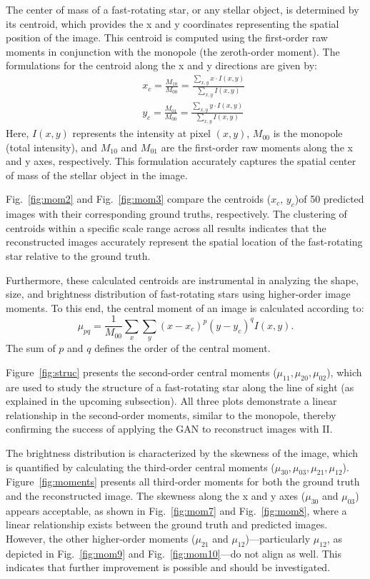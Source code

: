 The center of mass of a fast-rotating star, or any stellar object, is determined by its centroid, which provides the x and y coordinates representing the spatial position of the image. This centroid is computed using the first-order raw moments in conjunction with the monopole (the zeroth-order moment). The formulations for the centroid along the x and y directions are given by:
\begin{eqnarray}
&&x_c = \frac{M_{10}}{M_{00}} = \frac{\sum_{x,y} x \cdot I(x,y)}{\sum_{x,y} I(x,y)} \nonumber \\
&&y_c = \frac{M_{01}}{M_{00}} = \frac{\sum_{x,y} y \cdot I(x,y)}{\sum_{x,y} I(x,y)}
\end{eqnarray}
Here, \(I(x,y)\) represents the intensity at pixel \((x,y)\), \(M_{00}\) is the monopole (total intensity), and \(M_{10}\) and \(M_{01}\) are the first-order raw moments along the x and y axes, respectively. This formulation accurately captures the spatial center of mass of the stellar object in the image.

Fig.~\ref{fig:mom2} and Fig.~\ref{fig:mom3} compare the centroids ($x_{c}$, $y_{c}$)of 50 predicted images with their corresponding ground truths, respectively. The clustering of centroids within a specific scale range across all results indicates that the reconstructed images accurately represent the spatial location of the fast-rotating star relative to the ground truth.

Furthermore, these calculated centroids are instrumental in analyzing the shape, size, and brightness distribution of fast-rotating stars using higher-order image moments. To this end, the central moment of an image is calculated according to:
\begin{equation}
	\mu_{pq} = \frac{1}{M_{00}}\sum_{x} \sum_{y} (x - x_c)^p (y - y_c)^q I(x, y).
\end{equation}
The sum of \(p\) and \(q\) defines the order of the central moment. 

Figure~\ref{fig:struc} presents the second-order central moments (\(\mu_{11}, \mu_{20}, \mu_{02}\)), which are used to study the structure of a fast-rotating star along the line of sight (as explained in the upcoming subsection). All three plots demonstrate a linear relationship in the second-order moments, similar to the monopole, thereby confirming the success of applying the GAN to reconstruct images with II.

The brightness distribution is characterized by the skewness of the image, which is quantified by calculating the third-order central moments (\(\mu_{30}, \mu_{03}, \mu_{21}, \mu_{12}\)). Figure~\ref{fig:moments} presents all third-order moments for both the ground truth and the reconstructed image. The skewness along the x and y axes (\(\mu_{30}\) and \(\mu_{03}\)) appears acceptable, as shown in Fig.~\ref{fig:mom7} and Fig.~\ref{fig:mom8}, where a linear relationship exists between the ground truth and predicted images. However, the other higher-order moments (\(\mu_{21}\) and \(\mu_{12}\))—particularly \(\mu_{12}\), as depicted in Fig.~\ref{fig:mom9} and Fig.~\ref{fig:mom10}—do not align as well. This indicates that further improvement is possible and should be investigated.

